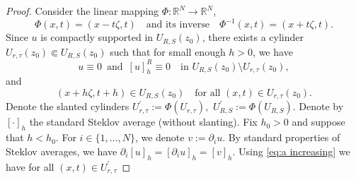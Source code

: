 \documentclass[10pt,a4paper]{amsart}
\numberwithin{equation}{section}
\newcommand{\RR}{\mathds{R}}
\begin{document}
\begin{proof}
Consider the linear mapping $\Phi:\RR^{N}\rightarrow\RR^{N}$,
\[
\Phi(x,t)=(x-t\zeta,t)\quad\text{and its inverse}\quad\Phi^{-1}(x,t)=(x+t\zeta,t).
\]
Since $u$ is compactly supported in $U_{R, S}(z_0)$, there exists a cylinder
$U_{r, \tau}(z_0)\Subset U_{R, S}(z_0)$ such that for small enough $h>0$, we have
\begin{equation*}
u\equiv 0 \,\,\, \text{and}\,\,\,  [u]_{h}^{R}\equiv0\quad\text{in }U_{R, S}(z_0)\setminus U_{r, \tau}(z_0),
\end{equation*}
and 
\[
(x+h\zeta,t+h)\in U_{R, S}(z_0)\quad\text{for all }(x,t)\in U_{r, \tau}(z_0).
\]
Denote the slanted cylinders $U^{\prime}_{r, \tau}:=\Phi(U_{r, \tau}),$ $U_{R, S}^{\prime}:=\Phi(U_{R, S})$.
 Denote by $[\cdot]_{h}$ the standard Steklov average (without slanting). Fix $h_{0}>0$ and suppose that $h<h_{0}$. For $i \in \{1,\ldots,N\}$, we denote $v := \partial_i u$. By standard properties of Steklov averages, we have $\partial_i[u]_h = [\partial_i u]_h = [v]_h$.
Using \eqref{eq:a increasing} we have for all $(x,t)\in U^{\prime}_{r, \tau}$ 


\end{proof}
\end{document}

